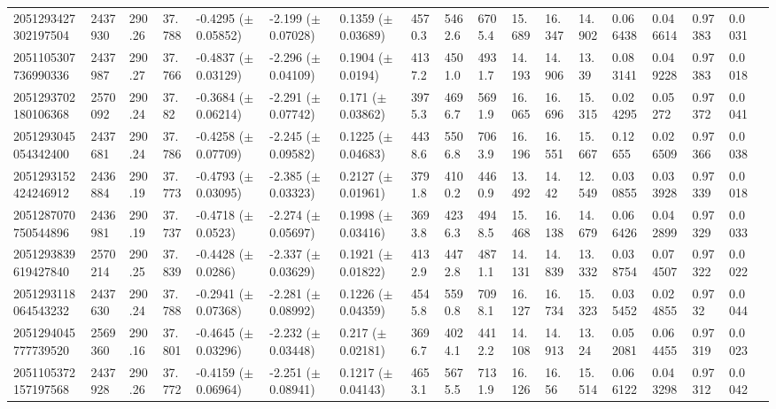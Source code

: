 \begin{sidewaystable}[htbp]
{\begin{tabular}{llllllllllllllllll}
            2051293427302197504 & 2437930 & 290.26 & 37.788 & -0.4295 ($\pm$ 0.05852) & -2.199 ($\pm$ 0.07028) & 0.1359 ($\pm$ 0.03689) & 4570.3 & 5462.6 & 6705.4 & 15.689 & 16.347 & 14.902 & 0.066438 & 0.046614 & 0.97383 & 0.0031 & \\
            2051105307736990336 & 2437987 & 290.27 & 37.766 & -0.4837 ($\pm$ 0.03129) & -2.296 ($\pm$ 0.04109) & 0.1904 ($\pm$ 0.0194) & 4137.2 & 4501.0 & 4931.7 & 14.193 & 14.906 & 13.39 & 0.083141 & 0.049228 & 0.97383 & 0.0018 & \\
            2051293702180106368 & 2570092 & 290.24 & 37.82 & -0.3684 ($\pm$ 0.06214) & -2.291 ($\pm$ 0.07742) & 0.171 ($\pm$ 0.03862) & 3975.3 & 4696.7 & 5691.9 & 16.065 & 16.696 & 15.315 & 0.024295 & 0.05272 & 0.97372 & 0.0041 & \\
            2051293045054342400 & 2437681 & 290.24 & 37.786 & -0.4258 ($\pm$ 0.07709) & -2.245 ($\pm$ 0.09582) & 0.1225 ($\pm$ 0.04683) & 4438.6 & 5506.8 & 7063.9 & 16.196 & 16.551 & 15.667 & 0.12655 & 0.026509 & 0.97366 & 0.0038 & \\
            2051293152424246912 & 2436884 & 290.19 & 37.773 & -0.4793 ($\pm$ 0.03095) & -2.385 ($\pm$ 0.03323) & 0.2127 ($\pm$ 0.01961) & 3791.8 & 4100.2 & 4460.9 & 13.492 & 14.42 & 12.549 & 0.030855 & 0.033928 & 0.97339 & 0.0018 & \\
            2051287070750544896 & 2436981 & 290.19 & 37.737 & -0.4718 ($\pm$ 0.0523) & -2.274 ($\pm$ 0.05697) & 0.1998 ($\pm$ 0.03416) & 3693.8 & 4236.3 & 4948.5 & 15.468 & 16.138 & 14.679 & 0.066426 & 0.042899 & 0.97329 & 0.0033 & \\
            2051293839619427840 & 2570214 & 290.25 & 37.839 & -0.4428 ($\pm$ 0.0286) & -2.337 ($\pm$ 0.03629) & 0.1921 ($\pm$ 0.01822) & 4132.9 & 4472.8 & 4871.1 & 14.131 & 14.839 & 13.332 & 0.038754 & 0.074507 & 0.97322 & 0.0022 & \\
            2051293118064543232 & 2437630 & 290.24 & 37.788 & -0.2941 ($\pm$ 0.07368) & -2.281 ($\pm$ 0.08992) & 0.1226 ($\pm$ 0.04359) & 4545.8 & 5590.8 & 7098.1 & 16.127 & 16.734 & 15.323 & 0.035452 & 0.024855 & 0.9732 & 0.0044 & \\
            2051294045777739520 & 2569360 & 290.16 & 37.801 & -0.4645 ($\pm$ 0.03296) & -2.232 ($\pm$ 0.03448) & 0.217 ($\pm$ 0.02181) & 3696.7 & 4024.1 & 4412.2 & 14.108 & 14.913 & 13.24 & 0.052081 & 0.064455 & 0.97319 & 0.0023 & \\
            2051105372157197568 & 2437928 & 290.26 & 37.772 & -0.4159 ($\pm$ 0.06964) & -2.251 ($\pm$ 0.08941) & 0.1217 ($\pm$ 0.04143) & 4653.1 & 5675.5 & 7131.9 & 16.126 & 16.56 & 15.514 & 0.066122 & 0.043298 & 0.97312 & 0.0042 & \\

\end{tabular}}
\end{sidewaystable}
